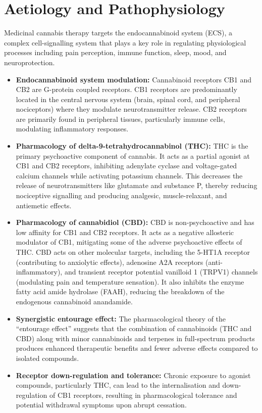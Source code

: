 \section*{Aetiology and Pathophysiology}
Medicinal cannabis therapy targets the endocannabinoid system (ECS), a complex cell-signalling system that plays a key role in regulating physiological processes including pain perception, immune function, sleep, mood, and neuroprotection.
\begin{itemize}
    \item \textbf{Endocannabinoid system modulation:} Cannabinoid receptors CB1 and CB2 are G-protein coupled receptors. CB1 receptors are predominantly located in the central nervous system (brain, spinal cord, and peripheral nociceptors) where they modulate neurotransmitter release. CB2 receptors are primarily found in peripheral tissues, particularly immune cells, modulating inflammatory responses.
    \item \textbf{Pharmacology of delta-9-tetrahydrocannabinol (THC):} THC is the primary psychoactive component of cannabis. It acts as a partial agonist at CB1 and CB2 receptors, inhibiting adenylate cyclase and voltage-gated calcium channels while activating potassium channels. This decreases the release of neurotransmitters like glutamate and substance P, thereby reducing nociceptive signalling and producing analgesic, muscle-relaxant, and antiemetic effects.
    \item \textbf{Pharmacology of cannabidiol (CBD):} CBD is non-psychoactive and has low affinity for CB1 and CB2 receptors. It acts as a negative allosteric modulator of CB1, mitigating some of the adverse psychoactive effects of THC. CBD acts on other molecular targets, including the 5-HT1A receptor (contributing to anxiolytic effects), adenosine A2A receptors (anti-inflammatory), and transient receptor potential vanilloid 1 (TRPV1) channels (modulating pain and temperature sensation). It also inhibits the enzyme fatty acid amide hydrolase (FAAH), reducing the breakdown of the endogenous cannabinoid anandamide.
    \item \textbf{Synergistic entourage effect:} The pharmacological theory of the ``entourage effect'' suggests that the combination of cannabinoids (THC and CBD) along with minor cannabinoids and terpenes in full-spectrum products produces enhanced therapeutic benefits and fewer adverse effects compared to isolated compounds.
    \item \textbf{Receptor down-regulation and tolerance:} Chronic exposure to agonist compounds, particularly THC, can lead to the internalisation and down-regulation of CB1 receptors, resulting in pharmacological tolerance and potential withdrawal symptoms upon abrupt cessation.
\end{itemize}

